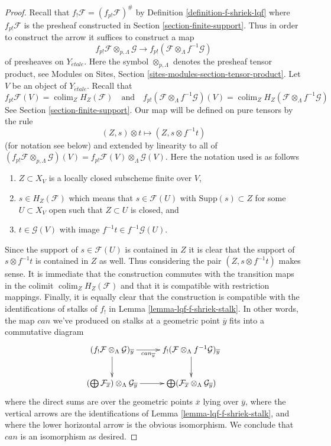 \documentclass{stacks-project}
\theoremstyle{plain}
\theoremstyle{definition}
\theoremstyle{remark}
\numberwithin{equation}{subsection}
\def\colim{\mathop{\mathrm{colim}}\nolimits}
\def\etale{{\acute{e}tale}}
\begin{document}
\begin{proof}
Recall that $f_!\mathcal{F} = (f_{p!}\mathcal{F})^\#$
by Definition \ref{definition-f-shriek-lqf} where
$f_{p!}\mathcal{F}$ is the presheaf
constructed in Section \ref{section-finite-support}.
Thus in order to construct the arrow it suffices to construct a map
$$
f_{p!}\mathcal{F} \otimes_{p, \Lambda} \mathcal{G}
\longrightarrow
f_{p!}(\mathcal{F} \otimes_\Lambda f^{-1}\mathcal{G})
$$
of presheaves on $Y_\etale$. Here the symbol $\otimes_{p, \Lambda}$
denotes the presheaf tensor product, see
Modules on Sites, Section \ref{sites-modules-section-tensor-product}.
Let $V$ be an object of $Y_\etale$. Recall that
$$
f_{p!}\mathcal{F}(V) = \colim_Z H_Z(\mathcal{F})
\quad\text{and}\quad
f_{p!}(\mathcal{F} \otimes_\Lambda f^{-1}\mathcal{G})(V) =
\colim_Z H_Z(\mathcal{F} \otimes_\Lambda f^{-1}\mathcal{G})
$$
See Section \ref{section-finite-support}. Our map will be defined
on pure tensors by the rule
$$
(Z, s) \otimes t \longmapsto (Z, s \otimes f^{-1}t)
$$
(for notation see below) and extended by linearity to all of
$(f_{p!}\mathcal{F} \otimes_{p, \Lambda} \mathcal{G})(V) =
f_{p!}\mathcal{F}(V) \otimes_\Lambda \mathcal{G}(V)$.
Here the notation used is as follows
\begin{enumerate}
\item $Z \subset X_V$ is a locally closed subscheme finite over $V$,
\item $s \in H_Z(\mathcal{F})$ which means that $s \in \mathcal{F}(U)$
with $\text{Supp}(s) \subset Z$ for some $U \subset X_V$ open such that
$Z \subset U$ is closed, and
\item $t \in \mathcal{G}(V)$ with image $f^{-1}t \in f^{-1}\mathcal{G}(U)$.
\end{enumerate}
Since the support of $s \in \mathcal{F}(U)$ is contained in $Z$ it is clear
that the support of $s \otimes f^{-1}t$ is contained in $Z$ as well.
Thus considering the pair $(Z, s \otimes f^{-1}t)$ makes sense.
It is immediate that the construction commutes with the transition
maps in the colimit $\colim_Z H_Z(\mathcal{F})$ and that it is
compatible with restriction mappings. Finally, it is equally clear
that the construction is compatible with the identifications of
stalks of $f_!$ in Lemma \ref{lemma-lqf-f-shriek-stalk}.
In other words, the map $can$ we've produced on stalks at a geometric
point $\overline{y}$ fits into a commutative diagram
$$
\xymatrix{
(f_!\mathcal{F} \otimes_\Lambda \mathcal{G})_{\overline{y}}
\ar[r]_-{can_{\overline{y}}} \ar[d] &
f_!(\mathcal{F} \otimes_\Lambda f^{-1}\mathcal{G})_{\overline{y}} \ar[d] \\
(\bigoplus \mathcal{F}_{\overline{x}})
\otimes_\Lambda \mathcal{G}_{\overline{y}} \ar[r] &
\bigoplus
(\mathcal{F}_{\overline{x}} \otimes_\Lambda \mathcal{G}_{\overline{y}})
}
$$
where the direct sums are over the geometric points $\overline{x}$
lying over $\overline{y}$, where the vertical arrows are the identifications
of Lemma \ref{lemma-lqf-f-shriek-stalk}, and where the lower horizontal arrow
is the obvious isomorphism.
We conclude that $can$ is an isomorphism as desired.
\end{proof}
\end{document}
